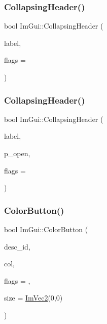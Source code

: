\mbox{\label{namespace_im_gui_ab52f9e08698c9d64abb05b98f5355146}} 
\subsubsection{\texorpdfstring{Collapsing\+Header()}{CollapsingHeader()}\hspace{0.1cm}{\footnotesize\ttfamily [1/2]}}
{\footnotesize\ttfamily bool Im\+Gui\+::\+Collapsing\+Header (\begin{DoxyParamCaption}\item[{const char $\ast$}]{label,  }\item[{\mbox{\hyperlink{imgui_8h_a0588fdd10c59b49a0159484fe9ec4564}{Im\+Gui\+Tree\+Node\+Flags}}}]{flags = {} }\end{DoxyParamCaption})}

\mbox{\label{namespace_im_gui_a19f369fc61f49ab7995ebb4da99028db}} 
\subsubsection{\texorpdfstring{Collapsing\+Header()}{CollapsingHeader()}\hspace{0.1cm}{\footnotesize\ttfamily [2/2]}}
{\footnotesize\ttfamily bool Im\+Gui\+::\+Collapsing\+Header (\begin{DoxyParamCaption}\item[{const char $\ast$}]{label,  }\item[{bool $\ast$}]{p\+\_\+open,  }\item[{\mbox{\hyperlink{imgui_8h_a0588fdd10c59b49a0159484fe9ec4564}{Im\+Gui\+Tree\+Node\+Flags}}}]{flags = {} }\end{DoxyParamCaption})}

\mbox{\label{namespace_im_gui_a82b18bfe08594b76c08894848d1e6fce}} 
\subsubsection{\texorpdfstring{Color\+Button()}{ColorButton()}}
{\footnotesize\ttfamily bool Im\+Gui\+::\+Color\+Button (\begin{DoxyParamCaption}\item[{const char $\ast$}]{desc\+\_\+id,  }\item[{const \mbox{\hyperlink{struct_im_vec4}{Im\+Vec4}} \&}]{col,  }\item[{\mbox{\hyperlink{imgui_8h_a6b2d5e95adc38f22c021252189f669c6}{Im\+Gui\+Color\+Edit\+Flags}}}]{flags = {},  }\item[{\mbox{\hyperlink{struct_im_vec2}{Im\+Vec2}}}]{size = {\ttfamily \mbox{\hyperlink{struct_im_vec2}{Im\+Vec2}}(0,0)} }\end{DoxyParamCaption})}

